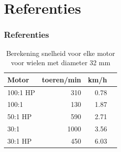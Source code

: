 \documentclass[aspectratio=169,kulak,t,handout]{kulakbeamer} %
\begin{document}
	
\section*{Referenties}

\begin{frame}[allowframebreaks]
	\frametitle{\Large Referenties}
	\nocite{*}
	
	
\end{frame}


\begin{frame}
	\begin{table}
		\centering
		
		\begin{tabular}{|l|r|r|r|}\hline
			\textbf{Motor}&	\textbf{toeren/min} &	\textbf{km/h}	\\\hline
			100:1 HP&	310&	0.78\\\hline
			100:1&	130&	1.87 	\\\hline
			50:1 HP&	590&	2.71 \\\hline
			30:1&	1000&	3.56	\\\hline
			30:1 HP&	450&	6.03 	\\\hline
		\end{tabular}
		\caption{Berekening snelheid voor elke motor voor wielen met diameter 32 mm}\label{MotorenTab}
		
	\end{table}
\end{frame}
\end{document}
